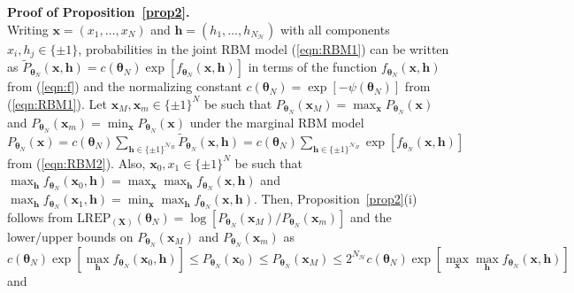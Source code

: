 \documentclass[12pt]{article}
\theoremstyle{definition}
\newcommand{\REP}{\mathrm{LREP}}
\begin{document}
\noindent\textbf{Proof of Proposition~\ref{prop2}.}\\
Writing $\boldsymbol x=(x_1,\ldots,x_N)$ and $\boldsymbol h =(h_1,\ldots,h_{N_{\mathcal{H}}})$ with all components $x_i,h_j\in\{\pm 1\}$,
probabilities in the joint RBM model (\ref{eqn:RBM1}) can be written as $\tilde{P}_{\boldsymbol \theta_N} (\boldsymbol x, \boldsymbol h) =
c(\boldsymbol \theta_N)\exp[ f_{\boldsymbol \theta_N} (\boldsymbol x, \boldsymbol h)]$ in terms of the function
$f_{\boldsymbol \theta_N} (\boldsymbol x, \boldsymbol h)$  from (\ref{eqn:f}) and the normalizing constant $ c(\boldsymbol \theta_N)= \exp [-
\psi(\boldsymbol \theta_N)]$ from (\ref{eqn:RBM1}).  Let $\boldsymbol x_M, \boldsymbol x_m\in\{\pm 1\}^N$ be such that
$P_{\boldsymbol \theta_N} (\boldsymbol x_M) = \max_{\boldsymbol x}P_{\boldsymbol \theta_N} (\boldsymbol x)$ and
$P_{\boldsymbol \theta_N} (\boldsymbol x_m) = \min_{\boldsymbol x}P_{\boldsymbol \theta_N} (\boldsymbol x)$ under the marginal RBM model $P_{\boldsymbol \theta_N} (\boldsymbol x) =c(\boldsymbol \theta_N)\sum_{\boldsymbol h \in\{\pm 1\}^{\mathcal{N}_H}} \tilde{P}_{\boldsymbol \theta_N} (\boldsymbol x, \boldsymbol h)= c(\boldsymbol \theta_N)\sum_{\boldsymbol h \in\{\pm 1\}^{\mathcal{N}_H}} \exp[ f_{\boldsymbol \theta_N} (\boldsymbol x, \boldsymbol h)]$ from (\ref{eqn:RBM2}). Also, $\boldsymbol x_0,x_1\in\{\pm 1\}^N$ be such that $\max_{\boldsymbol h}f_{\boldsymbol \theta_N} (\boldsymbol x_0, \boldsymbol h)=\max_{\boldsymbol x}\max_{\boldsymbol h}f_{\boldsymbol \theta_N} (\boldsymbol x , \boldsymbol h)$
and $\max_{\boldsymbol h}f_{\boldsymbol \theta_N} (\boldsymbol x_1, \boldsymbol h)=\min_{\boldsymbol x}\max_{\boldsymbol h}f_{\boldsymbol \theta_N} (\boldsymbol x , \boldsymbol h)$.
 Then, Proposition~\ref{prop2}(i) follows from $\REP_{(\boldsymbol X)}(\boldsymbol \theta_N) = \log[P_{\boldsymbol \theta_N} (\boldsymbol x_M) /P_{\boldsymbol \theta_N} (\boldsymbol x_m) ]$ and the lower/upper bounds on $P_{\boldsymbol \theta_N} (\boldsymbol x_M) $ and $P_{\boldsymbol \theta_N} (\boldsymbol x_m)$ as
\[
  c(\boldsymbol \theta_N) \exp[\max_{\boldsymbol h}f_{\boldsymbol \theta_N} (\boldsymbol x_0 , \boldsymbol h)]
  \leq P_{\boldsymbol \theta_N} (\boldsymbol x_0) \leq  P_{\boldsymbol \theta_N} (\boldsymbol x_M) \leq  2^{N_{\mathcal{H}}} c(\boldsymbol \theta_N) \exp[\max_{\boldsymbol x}\max_{\boldsymbol h}f_{\boldsymbol \theta_N} (\boldsymbol x , \boldsymbol h)]
\]
 and
\end{document}
